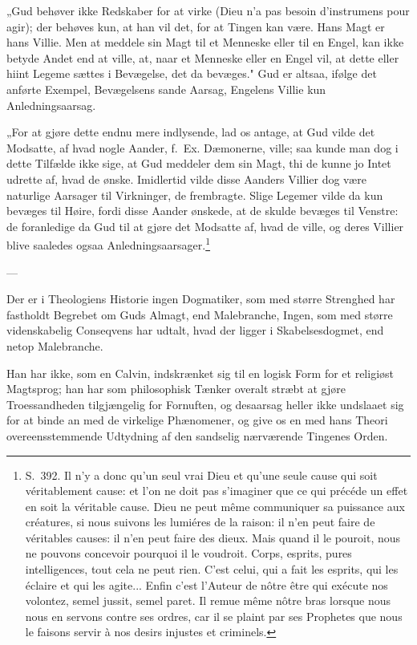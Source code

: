 \documentclass[12pt,a4paper]{article}
\newcommand{\opage}[1]{\marginnote{\footnotesize\textit{[#1]}}}
\begin{document}
„Gud behøver ikke Redskaber for at virke (Dieu n'a pas besoin d'instrumens pour
agir); der behøves kun, at han vil det, for at Tingen kan være. Hans Magt er
hans Villie. Men at meddele sin Magt til et Menneske eller til en Engel, kan
ikke betyde Andet end at ville, at, naar et Menneske eller en Engel vil, at dette
eller hiint Legeme sættes i Bevægelse, det da bevæges."
\opage{22} Gud er altsaa, ifølge det anførte Exempel, Bevægelsens sande Aarsag, Engelens
Villie kun Anledningsaarsag.

„For at gjøre dette endnu mere indlysende, lad os antage, at Gud vilde det
Modsatte, af hvad nogle Aander, f.~Ex. Dæmonerne, ville; saa kunde man dog i
dette Tilfælde ikke sige, at Gud meddeler dem sin Magt, thi de kunne jo Intet
udrette af, hvad de ønske. Imidlertid vilde disse Aanders Villier dog være
naturlige Aarsager til Virkninger, de frembragte. Slige Legemer vilde da kun
bevæges til Høire, fordi disse Aander ønskede, at de skulde bevæges til Venstre:
de foranledige da Gud til at gjøre det Modsatte af, hvad de ville, og deres
Villier blive saaledes ogsaa Anledningsaarsager.\footnote{S.~392. Il n'y a donc
qu'un seul vrai Dieu et qu'une seule cause qui soit véritablement cause: et l'on
ne doit pas s'imaginer que ce qui précéde un effet en soit la véritable cause.
Dieu ne peut même communiquer sa puissance aux créatures, si nous suivons les
lumiéres de la raison: il n'en peut faire de véritables causes: il n'en peut
faire des dieux. Mais quand il le pouroit, nous ne pouvons concevoir pourquoi il
le voudroit. Corps, esprits, pures intelligences, tout cela ne peut rien. C'est
celui, qui a fait les esprits, qui les éclaire et qui les agite... Enfin c'est
l'Auteur de nôtre être qui exécute nos volontez, semel jussit, semel paret. Il
remue même nôtre bras lorsque nous nous en servons contre ses ordres, car il se
plaint par ses Prophetes que nous le faisons servir à nos desirs injustes et
criminels.}

\begin{center}---\end{center}

Der er i Theologiens Historie ingen Dogmatiker, som med større Strenghed har
fastholdt Begrebet om Guds Almagt, end Malebranche, Ingen, som med større
videnskabelig Conseqvens har udtalt, hvad der ligger i Skabelsesdogmet, end netop
Malebranche.

Han har ikke, som en Calvin, indskrænket sig til en logisk Form for et religiøst
Magtsprog; han har som philosophisk Tænker overalt stræbt at gjøre
Troessandheden tilgjængelig for Fornuften, og desaarsag heller ikke undslaaet sig
for at binde an med de virkelige Phænomener, og give os en med hans Theori
overeensstemmende Udtydning af den sandselig nærværende Tingenes Orden.
\end{document}

